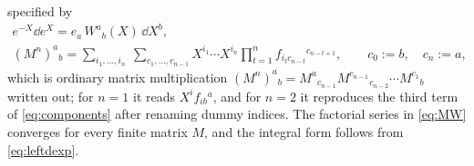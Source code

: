 specified by
\begin{equation}\label{eq:thetaW}
\begin{gathered}
 e^{-X}\dd e^X=e_a\,W^a{}_b(X)\,\dd X^b,\\
 (M^n)^a{}_b=\sum_{i_1,\ldots,i_n}\ \sum_{c_1,\ldots,c_{n-1}}
 X^{i_1}\cdots X^{i_n}\prod_{t=1}^{n}f_{i_tc_{n-t}}{}^{c_{n-t+1}},
 \qquad c_0:=b,\quad c_n:=a,
\end{gathered}
\end{equation}
which is ordinary matrix multiplication
$(M^n)^a{}_b=M^a{}_{c_{n-1}}M^{c_{n-1}}{}_{c_{n-2}}\cdots M^{c_1}{}_b$
written out; for $n=1$ it reads $X^if_{ib}{}^a$, and for $n=2$ it
reproduces the third term of \eqref{eq:components} after renaming dummy
indices. The factorial series
in \eqref{eq:MW} converges for every finite matrix $M$, and the integral
form follows from \eqref{eq:leftdexp}.

